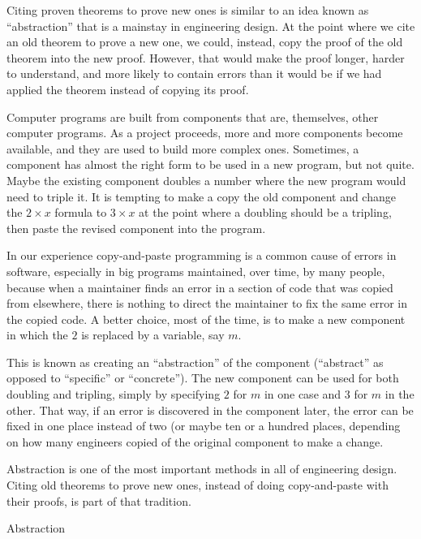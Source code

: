 \begin{aside}
Citing proven theorems to prove new ones
is similar to an idea known as ``abstraction''
that is a mainstay in engineering design.
At the point where we cite an old theorem to prove a new one,
we could, instead, copy the proof of the old theorem into the new proof.
However, that would make the proof longer, harder to understand,
and more likely to contain errors than it would be if we had
applied the theorem instead of copying its proof.

Computer programs are built from components that are, themselves,
other computer programs. As a project proceeds, more and more
components become available, and they are used to build more complex ones.
Sometimes, a component has almost the right form to be used in a new program,
but not quite.
Maybe the existing component doubles a number where the new program would need
to triple it. It is tempting to make a copy the
old component and change the $2 \times x$ formula to $3 \times x$
at the point where a doubling should be a tripling,
then paste the revised component into the program.

In our experience
copy-and-paste programming is
a common cause of errors in software,
especially in big programs maintained,
over time, by many people, because
when a maintainer finds an error in
a section of code that was copied from elsewhere,
there is nothing to direct the maintainer to fix
the same error in the copied code.
A better choice, most of the time,
is to make a new component
in which the $2$ is replaced by a variable,
say $m$.

This is known as creating an ``abstraction'' of the component
(``abstract'' as opposed to ``specific'' or ``concrete'').
The new component can be used for both doubling and tripling,
simply by specifying $2$ for $m$ in one case and $3$ for $m$ in the other.
That way, if an error is discovered in the component later,
the error can be fixed in one place instead of two
(or maybe ten or a hundred places, depending on how many engineers
copied of the original component to make a change.

Abstraction is one of the most important methods in
all of engineering design. Citing old theorems to prove new ones,
instead of doing copy-and-paste with their proofs, 
is part of that tradition.
\caption{Abstraction}
\label{abstraction}
\end{aside}

